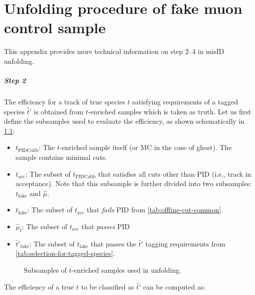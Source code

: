 \chapter{Unfolding procedure of fake muon control sample}
\label{appx:unfold-tech}

This appendix provides more technical information on step 2--4 in \muon misID
unfolding.

\paragraph{Step 2}
The efficiency 
for a track of true species $t$ satisfying requirements of
a tagged species $\hat{t}'$ is obtained from $t$-enriched \pidcalib samples
which is taken as truth.
Let us first define the subsamples used to evaluate the efficiency,
as shown schematically in \cref{fig:relation-unfolding-sets}:

\begin{itemize}
    \item $t_\text{PIDCalib}$: The $t$-enriched \pidcalib sample itself
        (or MC in the case of ghost).
        The sample contains minimal cuts.
    \item $t_\text{acc}$: The subset of $t_\text{PIDCalib}$ that satisfies all \muon
        cuts other than PID (i.e., track in \muon acceptance).
        Note that this subsample is further divided into two subsamples:
        $t_\text{fake}$ and $\hat{\mu}$.
    \item $t_\text{fake}$: The subset of $t_{acc}$ that \emph{fails} \muon PID
        from \cref{tab:offline-cut-common}.
    \item $\hat{\mu}_t$: The subset of $t_{acc}$ that \emph{passes} \muon PID
    \item $\hat{t}'_\text{fake}$: The subset of $t_\text{fake}$ that passes the
        $\hat{t}'$ tagging requirements
        from \cref{tab:selection-for-tagged-species}.
\end{itemize}

\begin{figure}[ht]
    \centering
    \resizebox{0.8\columnwidth}{!}{
        
    }
    \caption{Subsamples of $t$-enriched \pidcalib samples used in unfolding.}
    \label{fig:relation-unfolding-sets}
\end{figure}


The efficiency  of a true $t$ to be classified as $\hat{t}'$
can be computed as:

